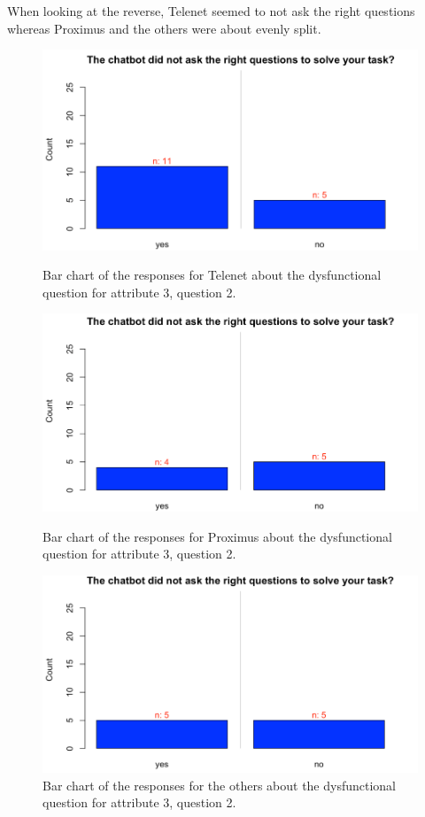 When looking at the reverse, Telenet seemed to not ask the right questions whereas Proximus and the others were about evenly split.\\
\begin{figure}[!htb]
	\includegraphics[width=\linewidth]{../LaTeX/Figures/Comparative/DQ3Tb.png}
	\caption{Bar chart of the responses for Telenet about the dysfunctional question for attribute 3, question 2.}\label{fig:DQ3Tb}
	\endminipage\hfill
	\includegraphics[width=\linewidth]{../LaTeX/Figures/Comparative/DQ3Pb.png}
	\caption{Bar chart of the responses for Proximus about the dysfunctional question for attribute 3, question 2.}\label{fig:DQ3Pb}
	\endminipage\hfill
	\includegraphics[width=\linewidth]{../LaTeX/Figures/Comparative/DQ3Ob.png}
	\caption{Bar chart of the responses for the others about the dysfunctional question for attribute 3, question 2.}\label{fig:DQ3Ob}
	\endminipage\hfill
\end{figure}
